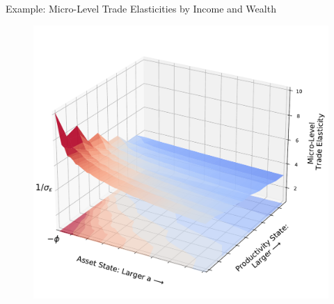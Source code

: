 \documentclass[9pt,pdftex,aspectratio=1610]{beamer}
\theoremstyle{definition}
\begin{document}


\begin{frame}[t]{Example: Micro-Level Trade Elasticities by Income and Wealth}
\vspace{-.5cm}
\begin{figure}[t]
\centerline{
\includegraphics[scale = 0.4]{../notes/figures/micro-elasticity.pdf}}
\end{figure}
\end{frame}

\end{document}
